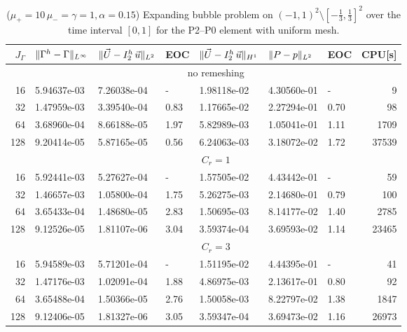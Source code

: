 \begin{table}
\center
\hspace*{-3.25cm}
\begin{tabular}{rllllllr}
\hline
$J_\Gamma$ & $\|\Gamma^h - \Gamma\|_{L^\infty}$ & $\|\vec U - I^h_{2}\,\vec u\|_{L^2}$ & EOC & $\|\vec U - I^h_{2}\,\vec u\|_{H^1}$ & $\|P - p\|_{L^2}$ & EOC
& CPU[s] \\
\hline
& \multicolumn{7}{c}{no remeshing} \\
\hline
 16 & 5.94637e-03 & 7.26038e-04 &    - & 1.98118e-02 & 4.30560e-01 &    - &
9 \\
 32 & 1.47959e-03 & 3.39540e-04 & 0.83 & 1.17665e-02 & 2.27294e-01 & 0.70 &
98 \\
 64 & 3.68960e-04 & 8.66188e-05 & 1.97 & 5.82989e-03 & 1.05041e-01 & 1.11 &
1709 \\
128 & 9.20414e-05 & 5.87165e-05 & 0.56 & 6.24063e-03 & 3.18072e-02 & 1.72 &
37539 \\
\hline
& \multicolumn{7}{c}{$C_r=1$} \\
\hline
 16 & 5.92441e-03 & 5.27627e-04 &    - & 1.57505e-02 & 4.43442e-01 &    - &
59 \\
 32 & 1.46657e-03 & 1.05800e-04 & 1.75 & 5.26275e-03 & 2.14680e-01 & 0.79 &
100 \\
 64 & 3.65433e-04 & 1.48680e-05 & 2.83 & 1.50695e-03 & 8.14177e-02 & 1.40 &
2785 \\
128 & 9.12526e-05 & 1.81107e-06 & 3.04 & 3.59374e-04 & 3.69593e-02 & 1.14 &
23465 \\
\hline
& \multicolumn{7}{c}{$C_r=3$} \\
\hline
 16 & 5.94589e-03 & 5.71201e-04 &    - & 1.51195e-02 & 4.44395e-01 &    - &
41 \\
 32 & 1.47176e-03 & 1.02091e-04 & 1.88 & 4.86975e-03 & 2.13617e-01 & 0.80 &
92 \\
 64 & 3.65488e-04 & 1.50366e-05 & 2.76 & 1.50058e-03 & 8.22797e-02 & 1.38 &
1847 \\
128 & 9.12406e-05 & 1.81327e-06 & 3.05 & 3.59347e-04 & 3.69473e-02 & 1.16 &
26973 \\
\hline
\end{tabular}
\hspace*{-3.25cm}
\caption[Stokes expanding bubble uniform mesh errors P2--P0]
{($\mu_+ = 10\,\mu_- = \gamma = 1,\alpha = 0.15$) Expanding bubble
problem on $(-1,1)^2\setminus[-\frac{1}{3},\frac{1}{3}]^2$ over the time
interval $[0,1]$ for the P2--P0 element with uniform mesh.}
\label{tab:expandingbubble2Dp2p0}
\end{table}
